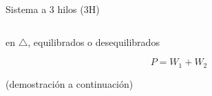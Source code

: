 \documentclass[aspectratio=169, usenames,svgnames,dvipsnames]{beamer}
\begin{document}
\begin{frame}{Sistema a 3 hilos (3H)}
\begin{columns}
\begin{column}{0.53\linewidth}
\begin{itemize}
            en $\triangle$, equilibrados o desequilibrados
        \end{itemize}

        \vspace{2mm}
        
        \centering
        

        \vspace{-2mm}
        \[ 
            \boxed{\; P = W_1+W_2 \;}
        \]

        \small{(demostración a continuación)}
    \end{column}
    \end{columns}
\end{frame}

\end{document}

